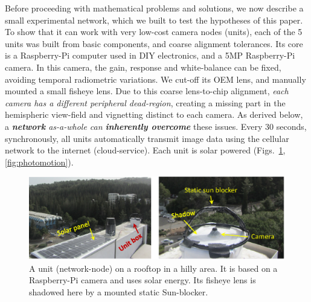 \documentclass[runningheads]{llncs}
\begin{document}
Before proceeding with mathematical problems and solutions, we now describe  a small experimental network, which we built to test the hypotheses of this paper.  To show that it can work with very low-cost  camera nodes (units), each of the 5 units was built from basic components, and coarse alignment tolerances. Its core is a Raspberry-Pi computer used in DIY electronics, and a 5MP Raspberry-Pi camera. In this camera, the gain, response and white-balance can be fixed, avoiding temporal radiometric variations. We cut-off its OEM lens, and manually mounted a small fisheye lens. Due to this coarse lens-to-chip alignment, {\em each camera has a different peripheral dead-region}, creating a missing part in the hemispheric view-field and vignetting distinct to each camera. As derived below, a {\em {\bf network} as-a-whole can {\bf inherently overcome}} these issues. Every 30 seconds, synchronously, all units automatically transmit image data using the cellular network to the internet (cloud-service). Each unit is solar powered (Figs.~\ref{fig:system},\ref{fig:photomotion}).
\begin{figure}[t!]
\begin{center}
   \includegraphics[width=0.6\linewidth]{figures/system.eps}
\end{center}
   \vspace{-0.6cm}
   \caption{A unit (network-node) on a rooftop in a hilly area. It is based on a Raspberry-Pi camera
   and uses solar energy. Its fisheye lens is shadowed here by a mounted  static Sun-blocker.
   }
\label{fig:system}
\end{figure}
\end{document}
